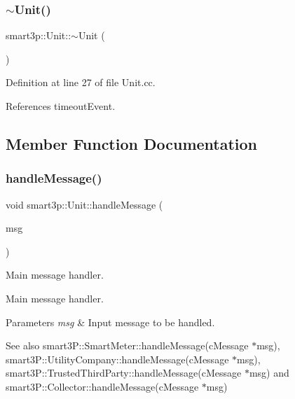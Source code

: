 \subsubsection{\texorpdfstring{$\sim$\+Unit()}{~Unit()}}
{\footnotesize\ttfamily smart3p\+::\+Unit\+::$\sim$\+Unit (\begin{DoxyParamCaption}{ }\end{DoxyParamCaption})\hspace{0.3cm}{\ttfamily [virtual]}}



Definition at line 27 of file Unit.\+cc.



References timeout\+Event.



\subsection{Member Function Documentation}
\mbox{\label{classsmart3p_1_1Unit_a7763e2e6ec9e31c7a4743bf674351c13}} 
\subsubsection{\texorpdfstring{handle\+Message()}{handleMessage()}}
{\footnotesize\ttfamily void smart3p\+::\+Unit\+::handle\+Message (\begin{DoxyParamCaption}\item[{c\+Message $\ast$}]{msg }\end{DoxyParamCaption})\hspace{0.3cm}{\ttfamily [protected]}}



Main message handler. 

Main message handler. 
\begin{DoxyParams}{Parameters}
{\em msg} & Input message to be handled. \\
\hline
\end{DoxyParams}
\begin{DoxySeeAlso}{See also}
smart3\+P\+::\+Smart\+Meter\+::handle\+Message(c\+Message $\ast$msg), smart3\+P\+::\+Utility\+Company\+::handle\+Message(c\+Message $\ast$msg), smart3\+P\+::\+Trusted\+Third\+Party\+::handle\+Message(c\+Message $\ast$msg) and smart3\+P\+::\+Collector\+::handle\+Message(c\+Message $\ast$msg) 
\end{DoxySeeAlso}


